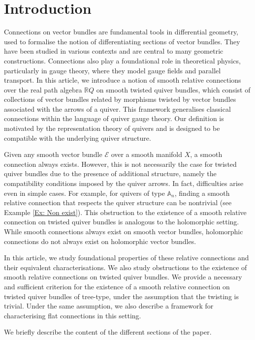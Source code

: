 \documentclass[12pt, reqno]{amsart}
\theoremstyle{plain}
\numberwithin{equation}{section}
\newcommand{\E}{\mathcal{E}}
\begin{document}
\section{Introduction}
Connections on vector bundles are fundamental tools in differential geometry, used to formalise the notion of differentiating sections of vector bundles. They have been studied in various contexts and are central to many geometric constructions. Connections also play a foundational role in theoretical physics, particularly in gauge theory, where they model gauge fields and parallel transport. In this article, we introduce a notion of smooth relative connections over the real path algebra $\mathbb{R}Q$ on smooth twisted quiver bundles, which consist of collections of vector bundles related by morphisms twisted by vector bundles associated with the arrows of a quiver. This framework generalises classical connections within the language of quiver gauge theory. Our definition is motivated by the representation theory of quivers and is designed to be compatible with the underlying quiver structure.

Given any smooth vector bundle $\E$ over a smooth manifold $X$, a smooth connection always exists. However, this is not necessarily the case for twisted quiver bundles due to the presence of additional structure, namely the compatibility conditions imposed by the quiver arrows. In fact, difficulties arise even in simple cases. For example, for quivers of type $\mathbb{A}_n$, finding a smooth relative connection that respects the quiver structure can be nontrivial (see Example \ref{Ex: Non exist}). This obstruction to the existence of a smooth relative connection on twisted quiver bundles is analogous to the holomorphic setting. While smooth connections always exist on smooth vector bundles, holomorphic connections do not always exist on holomorphic vector bundles.  


In this article, we study foundational properties of these relative connections and their equivalent characterisations. We also study obstructions to the existence of smooth relative connections on twisted quiver bundles. We provide a necessary and sufficient criterion for the existence of a smooth relative connection on twisted quiver bundles of tree-type, under the assumption that the twisting is trivial. Under the same assumption, we also describe a framework for characterising flat connections in this setting.

We briefly describe the content of the different sections of the paper.
\end{document}
